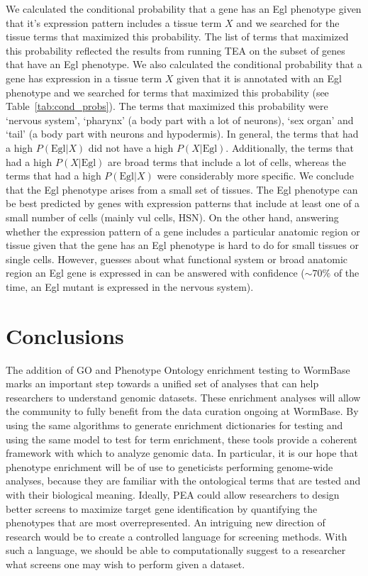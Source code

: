 \documentclass[10pt,letterpaper,twocolumn]{article}
\begin{document}
We calculated the conditional probability that a gene has an Egl phenotype given
that it's expression pattern includes a tissue term $X$ and we searched for the
tissue terms that maximized this probability. The list of terms that maximized this
probability reflected the results from running TEA on the subset of genes that have
an Egl phenotype. We also calculated the conditional probability that a gene has
expression in a tissue term $X$ given that it is annotated with an Egl phenotype
and we searched for terms that maximized this probability (see
Table~\ref{tab:cond_probs}). The terms that maximized this probability were
`nervous system', `pharynx' (a body part with a lot of neurons),
`sex organ' and `tail' (a body part with neurons and hypodermis). In general, the
terms that had a high $P(\text{Egl}|X)$ did not have a high $P(X|\text{Egl})$.
Additionally, the terms that had a high $P(X|\text{Egl})$ are broad terms that
include a lot of cells, whereas the terms that had a high $P(\text{Egl}|X)$
were considerably more specific.
We conclude that the Egl phenotype arises from a small set of tissues. The Egl
phenotype can be best predicted by genes with expression patterns that include
at least one of a small number of cells (mainly vul cells, HSN). On the other
hand, answering whether the expression pattern of a gene includes a particular
anatomic region or tissue given that the gene has an Egl phenotype is hard to
do for small tissues or single cells. However, guesses about what functional system
or broad anatomic region an Egl gene is expressed in can be answered with
confidence ($\sim70\%$ of the time, an Egl mutant is expressed in
the nervous system).

\section*{Conclusions}
The addition of GO and Phenotype Ontology enrichment testing to WormBase marks
an important step towards a unified set of analyses that can help researchers
to understand genomic datasets. These enrichment analyses will allow the community to
fully benefit from the data curation ongoing at WormBase. By using the same
algorithms to generate enrichment dictionaries for testing and using the
same model to test for term enrichment, these tools provide a coherent framework
with which to analyze genomic data. In particular, it is our hope that
phenotype enrichment will be of use to geneticists performing genome-wide
analyses, because they are familiar with the ontological terms that are tested
and with their biological meaning. Ideally, PEA could allow researchers to
design better screens to maximize target gene identification by quantifying
the phenotypes that are most overrepresented. An intriguing new direction of
research would be to create a controlled language for screening methods. With
such a language, we should be able to computationally suggest to a researcher
what screens one may wish to perform given a dataset.





\end{document}
